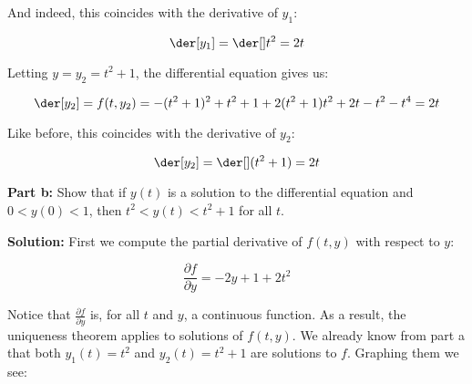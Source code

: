 \documentclass{article}
\begin{document}
And indeed, this coincides with the derivative of $y_1$:

\begin{equation*}
    \der[y_1]=\der[]t^2=2t
\end{equation*}

Letting $y=y_2=t^2+1$, the differential equation gives us:

\begin{equation*}
    \der[y_2]=f(t,y_2)=-(t^2+1)^2+t^2+1+2(t^2+1)t^2+2t-t^2-t^4=2t
\end{equation*}

Like before, this coincides with the derivative of $y_2$:

\begin{equation*}
    \der[y_2]=\der[](t^2+1)=2t
\end{equation*}

\noindent\textbf{Part b:} Show that if $y(t)$ is a solution to the differential equation and $0<y(0)<1$, then $t^2<y(t)<t^2+1$ for all $t$.
\bigskip

\noindent\textbf{Solution:} First we compute the partial derivative of $f(t,y)$ with respect to $y$:

\begin{equation*}
    \frac{\partial f}{\partial y}=-2y+1+2t^2
\end{equation*}

Notice that $\frac{\partial f}{\partial y}$ is, for all $t$ and $y$, a continuous function. As a result, the uniqueness theorem applies to solutions of $f(t,y)$. We already know from part a that both $y_1(t)=t^2$ and $y_2(t)=t^2+1$ are solutions to $f$. Graphing them we see:

\loadedtable

\begin{center}
\end{center}
\end{document}
